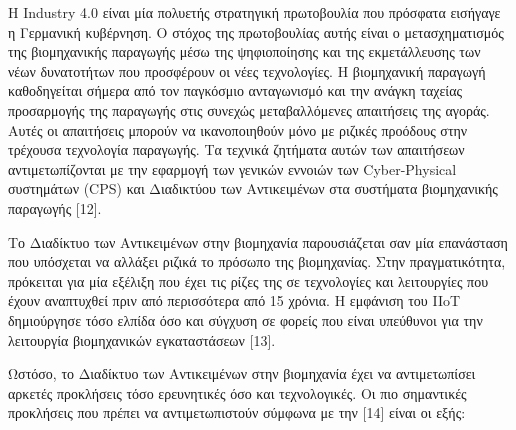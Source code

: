 Η Industry 4.0 είναι μία πολυετής στρατηγική πρωτοβουλία που πρόσφατα εισήγαγε η Γερμανική κυβέρνηση. Ο στόχος της πρωτοβουλίας αυτής είναι ο μετασχηματισμός της βιομηχανικής παραγωγής μέσω της ψηφιοποίησης και της εκμετάλλευσης των νέων δυνατοτήτων που προσφέρουν οι νέες τεχνολογίες. Η βιομη­χανική παραγωγή καθοδηγείται σήμερα από τον παγκόσμιο αντα­γωνισμό και την ανάγκη ταχείας προσαρμογής της παραγωγής στις συνεχώς μεταβαλλόμενες απαιτήσεις της αγοράς. Αυτές οι απαιτήσεις μπορούν να ικανοποιηθούν μόνο με ριζικές προόδους στην τρέχουσα τεχνολογία παραγωγής. Τα τεχνικά ζητήματα αυ­τών των απαιτήσεων αντιμετωπίζονται με την εφαρμογή των γε­νικών εννοιών των Cyber-Physical συστημάτων (CPS) και Διαδι­κτύου των Αντικειμένων στα συστήματα βιομηχανικής πα­ραγωγής [12].

Το Διαδίκτυο των Αντικειμένων στην βιομηχανία παρουσιάζεται σαν μία επανάσταση που υπόσχεται να αλλάξει ριζικά το πρόσωπο της βιομηχανίας. Στην πραγματικότητα, πρόκειται για μία εξέλιξη που έχει τις ρίζες της σε τεχνολογίες και λειτουργίες που έχουν αναπτυχθεί πριν από περισσότερα από 15 χρόνια. Η εμφάνιση του IIoT δημιούργησε τόσο ελπίδα όσο και σύγχυση σε φορείς που είναι υπεύθυνοι για την λειτουργία βιομηχανικών εγκαταστάσεων [13]. 

Ωστόσο, το Διαδίκτυο των Αντικειμένων στην βιομηχανία έχει να αντιμετωπίσει αρκετές προκλήσεις τόσο ερευνητικές όσο και τεχνολογικές. Οι πιο σημαντικές προκλήσεις που πρέπει να αντιμετωπιστούν σύμφωνα με την [14] είναι οι εξής:

